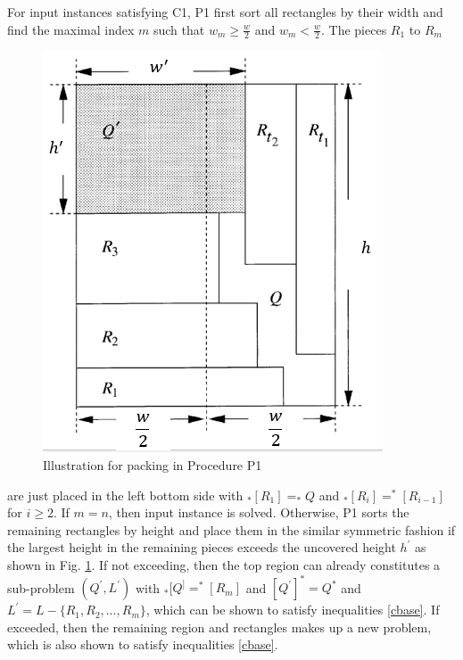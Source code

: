 \documentclass[sigplan,screen,nonacm]{acmart}\settopmatter{printfolios=true,printccs=false,printacmref=false}
\begin{document}
\par For input instances satisfying C1, P1 first sort all rectangles by their width and find the maximal index $m$ such that $w_m\geq\frac{w}{2}$ and $w_m<\frac{w}{2}$. The pieces $R_1$ to $R_m$
\begin{figure}[htbp]
	\centering
	\includegraphics[width=\linewidth]{steinC1}
	\caption{Illustration for packing in Procedure P1}
	\label{steinC1Illus}
\end{figure}
are just placed in the left bottom side with $_*[R_1]=_*Q$ and $_*[R_i]=^*[R_{i-1}]$ for $i\geq 2$. If $m=n$, then input instance is solved. Otherwise, P1 sorts the remaining rectangles by height and place them in the similar symmetric fashion if the largest height in the remaining pieces exceeds the uncovered height $h^\prime$ as shown in Fig. \ref{steinC1Illus}. If not exceeding, then the top region can already constitutes a sub-problem $(Q^\prime, L^\prime)$ with $_*[Q^]=^*[R_m]$ and $[Q^\prime]^*=Q^*$ and $L^\prime=L-\{R_1, R_2, \ldots, R_m\}$, which can be shown to satisfy inequalities \ref{cbase}. If exceeded, then the remaining region and rectangles makes up a new problem, which is also shown to satisfy inequalities \ref{cbase}\cite{steinberg1997strip}.
\end{document}
